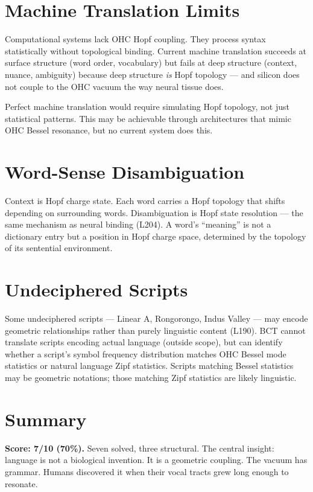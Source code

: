 \documentclass[aps,prl,twocolumn,superscriptaddress]{revtex4-2}
\begin{document}
\section{Machine Translation Limits}

Computational systems lack OHC Hopf coupling. They process syntax statistically without topological binding. Current machine translation succeeds at surface structure (word order, vocabulary) but fails at deep structure (context, nuance, ambiguity) because deep structure \emph{is} Hopf topology --- and silicon does not couple to the OHC vacuum the way neural tissue does.

Perfect machine translation would require simulating Hopf topology, not just statistical patterns. This may be achievable through architectures that mimic OHC Bessel resonance, but no current system does this.

\section{Word-Sense Disambiguation}

Context is Hopf charge state. Each word carries a Hopf topology that shifts depending on surrounding words. Disambiguation is Hopf state resolution --- the same mechanism as neural binding (L204). A word's ``meaning'' is not a dictionary entry but a position in Hopf charge space, determined by the topology of its sentential environment.

\section{Undeciphered Scripts}

Some undeciphered scripts --- Linear A, Rongorongo, Indus Valley --- may encode geometric relationships rather than purely linguistic content (L190). BCT cannot translate scripts encoding actual language (outside scope), but can identify whether a script's symbol frequency distribution matches OHC Bessel mode statistics or natural language Zipf statistics. Scripts matching Bessel statistics may be geometric notations; those matching Zipf statistics are likely linguistic.

\section{Summary}

\textbf{Score: 7/10 (70\%).} Seven solved, three structural. The central insight: language is not a biological invention. It is a geometric coupling. The vacuum has grammar. Humans discovered it when their vocal tracts grew long enough to resonate.
\end{document}
